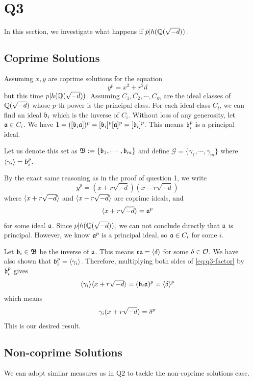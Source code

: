 \section{Q3}

In this section, we investigate what happens if $p | h(\mathbb{Q}(\sqrt{-d}))$.

\subsection{Coprime Solutions}

Assuming $x, y$ are coprime solutions for the equation 
$$
	y^p = x^2 + r^2 d
$$
but this time $p | h(\mathbb{Q}(\sqrt{-d}))$.
Assuming $C_1, C_2, \cdots, C_m$ are the ideal classes of $\mathbb{Q}(\sqrt{-d})$ whose $p$-th power is the principal class.
For each ideal class $C_i$, we can find an ideal $\mathfrak{b}_i$ which is the inverse of $C_i$.
Without loss of any generosity, let $\mathfrak{a} \in C_i$. 
We have $1 = ([\mathfrak{b}_i \mathfrak{a}])^p = [\mathfrak{b}_i]^p[\mathfrak{a}]^p = [\mathfrak{b}_i]^{p}$.
This means $\mathfrak{b}_i^p$ is a principal ideal.

Let us denote this set as $\mathfrak{B}:= \{\mathfrak{b}_1, \cdots, \mathfrak{b}_m\}$ and define 
$\mathcal{G} = \{\gamma_1, \cdots, \gamma_m\}$ where $\langle \gamma_i\rangle = \mathfrak{b}_i^p$.

By the exact same reasoning as in the proof of question 1, we write
$$
	y^p = (x + r\sqrt{-d})(x - r\sqrt{-d})
$$
where $\langle x+ r\sqrt{-d} \rangle$ and $\langle x - r\sqrt{-d} \rangle$ are coprime ideals, and 
\begin{equation}\label{eq:q3-factor}
	\langle x + r\sqrt{-d} \rangle = \mathfrak{a}^p
\end{equation}
for some ideal $\mathfrak{a}$.
Since $p | h(\mathbb{Q}(\sqrt{-d}))$, we can not conclude directly that $\mathfrak{a}$ is principal.
However, we know $\mathfrak{a}^p$ is a principal ideal, so $\mathfrak{a} \in C_i$  for some $i$.

Let $\mathfrak{b}_i \in \mathfrak{B}$ be the inverse of $\mathfrak{a}$.
This means $\mathfrak{c}\mathfrak{a} = \langle \delta \rangle$ for some $\delta \in \mathcal{O}$.
We have also shown that $\mathfrak{b}_i^p = \langle \gamma_i \rangle$.
Therefore, multiplying both sides of \eqref{eq:q3-factor} by $\mathfrak{b}_i^p$ gives 
$$
	\langle \gamma_i \rangle \langle x + r\sqrt{-d} \rangle = (\mathfrak{b}_i\mathfrak{a})^p = \langle \delta \rangle^p
$$
which means 
$$
	\gamma_i (x + r\sqrt{-d}) = \delta^p
$$
This is our desired result.

\subsection{Non-coprime Solutions}

We can adopt similar measures as in Q2 to tackle the non-coprime solutions case. 

